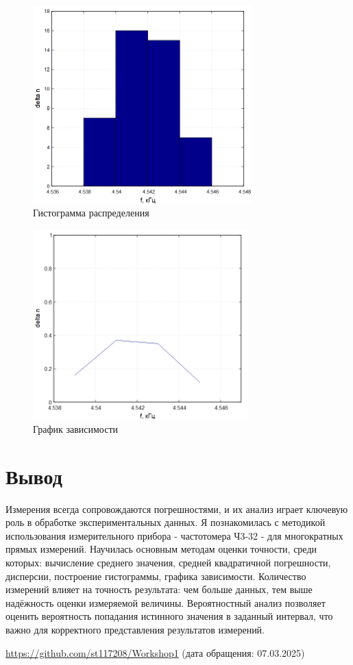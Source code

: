 \begin{figure}
\centering
\includegraphics[width=0.75\textwidth]{Plot3.png}
\caption{Гистограмма распределения}
\label{fig:plot3}
\end{figure}

\begin{figure}
\centering
\includegraphics[width=0.74\textwidth]{Plot4.png}
\caption{График зависимости}
\label{fig:plot4}
\end{figure}

\section{Вывод}
Измерения всегда сопровождаются погрешностями, и их анализ играет ключевую роль в обработке экспериментальных данных. Я познакомилась с методикой использования измерительного прибора - частотомера Ч3-32 - для многократных прямых измерений. Научилась основным методам оценки точности, среди которых: вычисление среднего значения, средней квадратичной погрешности, дисперсии, построение гистограммы, графика зависимости. Количество измерений влияет на точность результата: чем больше данных, тем выше надёжность оценки измеряемой величины. Вероятностный анализ позволяет оценить вероятность попадания истинного значения в заданный интервал, что важно для корректного представления результатов измерений. 

\begin{thebibliography}{9}
\url{https://github.com/st117208/Workshop1}  (дата обращения: 07.03.2025)
\end{thebibliography}